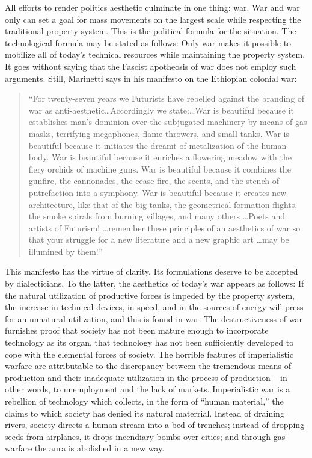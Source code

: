 \documentclass[11pt, letterpaper]{article}
\begin{document}
All efforts to render politics aesthetic culminate in one thing: war. War and
war only can set a goal for mass movements on the largest scale while
respecting the traditional property system. This is the political formula for
the situation. The technological formula may be stated as follows: Only war
makes it possible to mobilize all of today’s technical resources while
maintaining the property system. It goes without saying that the Fascist
apotheosis of war does not employ such arguments. Still, Marinetti says in his
manifesto on the Ethiopian colonial war:
\begin{quote}
	“For twenty-seven years we Futurists have rebelled against the branding of war
	as anti-aesthetic\ldots Accordingly we state:\ldots War is beautiful because it
	establishes man’s dominion over the subjugated machinery by means of gas masks,
	terrifying megaphones, flame throwers, and small tanks. War is beautiful
	because it initiates the dreamt-of metalization of the human body. War is
	beautiful because it enriches a flowering meadow with the fiery orchids of
	machine guns. War is beautiful because it combines the gunfire, the cannonades,
	the cease-fire, the scents, and the stench of putrefaction into a symphony. War
	is beautiful because it creates new architecture, like that of the big tanks,
	the geometrical formation flights, the smoke spirals from burning villages, and
	many others \ldots Poets and artists of Futurism! \ldots remember these principles of
	an aesthetics of war so that your struggle for a new literature and a new
	graphic art \ldots may be illumined by them!”
\end{quote}
This manifesto has the virtue of clarity. Its formulations deserve to be
accepted by dialecticians. To the latter, the aesthetics of today’s war appears
as follows: If the natural utilization of productive forces is impeded by the
property system, the increase in technical devices, in speed, and in the
sources of energy will press for an unnatural utilization, and this is found in
war. The destructiveness of war furnishes proof that society has not been
mature enough to incorporate technology as its organ, that technology has not
been sufficiently developed to cope with the elemental forces of society. The
horrible features of imperialistic warfare are attributable to the discrepancy
between the tremendous means of production and their inadequate utilization in
the process of production – in other words, to unemployment and the lack of
markets. Imperialistic war is a rebellion of technology which collects, in the
form of “human material,” the claims to which society has denied its natural
materrial. Instead of draining rivers, society directs a human stream into a
bed of trenches; instead of dropping seeds from airplanes, it drops incendiary
bombs over cities; and through gas warfare the aura is abolished in a new way.
\end{document}
